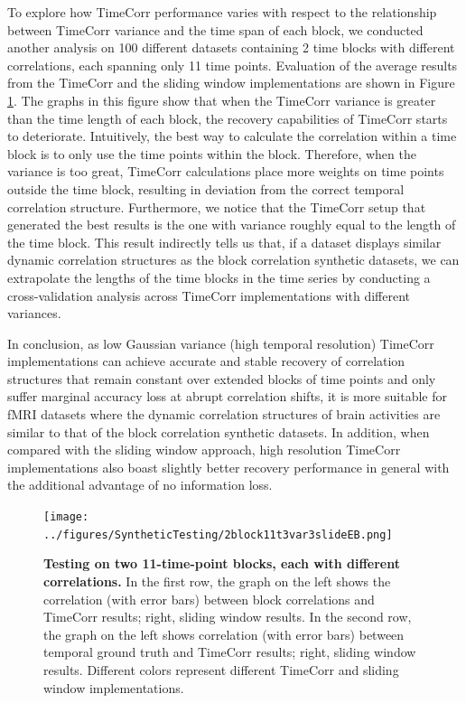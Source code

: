 \documentclass[11pt]{article}
\begin{document}
To explore how TimeCorr performance varies with respect to the relationship between TimeCorr variance and the time span of each block, we conducted another analysis on 100 different datasets containing 2 time blocks with different correlations, each spanning only 11 time points. Evaluation of the average results from the TimeCorr and the sliding window implementations are shown in Figure \ref{fig:2block11t}. The graphs in this figure show that when the TimeCorr variance is greater than the time length of each block, the recovery capabilities of TimeCorr starts to deteriorate. Intuitively, the best way to calculate the correlation within a time block is to only use the time points within the block. Therefore, when the variance is too great, TimeCorr calculations place more weights on time points outside the time block, resulting in deviation from the correct temporal correlation structure. Furthermore, we notice that the TimeCorr setup that generated the best results is the one with variance roughly equal to the length of the time block. This result indirectly tells us that, if a dataset displays similar dynamic correlation structures as the block correlation synthetic datasets, we can extrapolate the lengths of the time blocks in the time series by conducting a cross-validation analysis across TimeCorr implementations with different variances.

In conclusion, as low Gaussian variance (high temporal resolution) TimeCorr implementations can achieve accurate and stable recovery of correlation structures that remain constant over extended blocks of time points and only suffer marginal accuracy loss at abrupt correlation shifts, it is more suitable for fMRI datasets where the dynamic correlation structures of brain activities are similar to that of the block correlation synthetic datasets. In addition, when compared with the sliding window approach, high resolution TimeCorr implementations also boast slightly better recovery performance in general with the additional advantage of no information loss.

\begin{figure}[!htb]
\texttt{[image: ../figures/SyntheticTesting/2block11t3var3slideEB.png]}
\caption{\textbf{Testing on two 11-time-point blocks, each with different correlations.} In the first row, the graph on the left shows the correlation (with error bars) between block correlations and TimeCorr results; right, sliding window results. In the second row, the graph on the left shows correlation (with error bars) between temporal ground truth and TimeCorr results; right, sliding window results. Different colors represent different TimeCorr and sliding window implementations.}
\label{fig:2block11t}
\end{figure}
\end{document}
